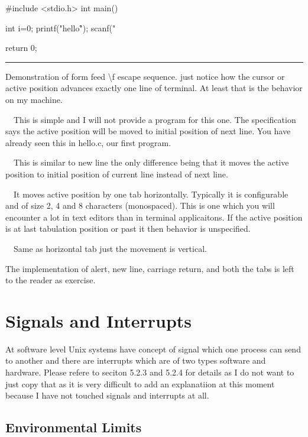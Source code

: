 #include <stdio.h>
int main()
{
  int i=0;
  printf("hello\f");
  scanf("%

  return 0;
}
\stopCPP
{}
\hrule
\blank[force,1mm]
\startalignment[middle]
Demonstration of form feed \backslash f escape sequence.
\stopalignment
just notice how the cursor or active position advances exactly one
line of terminal. At least that is the behavior on my machine.
\item{}\textreference[newline]~~This is simple and I
  will not provide a program for this one. The specification says the
  active position will be moved to initial position of next line. You
  have already seen this in hello.c, our first program.
\item{}\textreference[carriagereturn]~~This
  is similar to new line the only difference being that it moves the
  active position to initial position of current line instead of next
  line.
\item{}\textreference[tab]~~It moves active
  position by one tab horizontally. Typically it is configurable and
  of size 2, 4 and 8 characters (monospaced). This is one which you
  will encounter a lot in text editors than in terminal
  applicaitons. If the active position is at last tabulation position
  or past it then behavior is unspecified.
\item{}\textreference[vtab]~~Same as horizontal
  tab just the movement is vertical.
\stopitemize

The implementation of alert, new line, carriage return, and both the
tabs is left to the reader as exercise.

\section{Signals and Interrupts}
At software level Unix systems have concept of signal which one
process can send to another and there are interrupts which are of two
types software and hardware. Please refere to seciton 5.2.3 and 5.2.4
for details as I do not want to just copy that as it is very difficult
to add an explanatiion at this moment because I have not touched
signals and interrupts at all.

\subsection{Environmental Limits}
